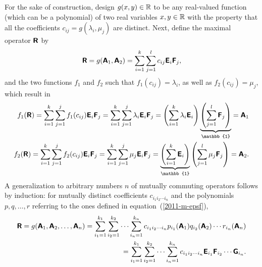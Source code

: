 {For the sake of construction, design $g(x,y)\in {\Bbb R}$ to be any real-valued function (which can be a polynomial) of two real variables $x,y \in {\Bbb R}$ with the property
that all the coefficients  $c_{ij} = g( \lambda_i,\mu_j )$ are distinct.
Next, define  the maximal operator $\textsf{\textbf{R}}$ by
\begin{equation}
\textsf{\textbf{R}} = g(\textsf{\textbf{A}}_1, \textsf{\textbf{A}}_2) =  \sum_{i=1}^k \sum_{j=1}^l c_{ij}  \textsf{\textbf{E}}_i\textsf{\textbf{F}}_j,
\end{equation}
and the two functions $f_1$ and $f_2$ such that
$f_1(c_{ij}) = \lambda_i$, as well as
$f_2(c_{ij}) = \mu_j$, which result in
\begin{equation}
\begin{split}
f_1(\textsf{\textbf{R}}) = \sum_{i=1}^k \sum_{j=1}^j f_1(c_{ij})  \textsf{\textbf{E}}_i\textsf{\textbf{F}}_j = \sum_{i=1}^k \sum_{j=1}^j \lambda_i  \textsf{\textbf{E}}_i\textsf{\textbf{F}}_j
= \left( \sum_{i=1}^k \lambda_i \textsf{\textbf{E}}_i\right) \underbrace{\left(\sum_{j=1}^l \textsf{\textbf{F}}_j\right)}_\mathbb{1} = \textsf{\textbf{A}}_1
\\
f_2(\textsf{\textbf{R}}) = \sum_{i=1}^k \sum_{j=1}^j f_2(c_{ij})  \textsf{\textbf{E}}_i\textsf{\textbf{F}}_j = \sum_{i=1}^k \sum_{j=1}^j \mu_j  \textsf{\textbf{E}}_i\textsf{\textbf{F}}_j
= \underbrace{\left(\sum_{i=1}^k \textsf{\textbf{E}}_i\right)}_\mathbb{1}\left( \sum_{j=1}^l \mu_j \textsf{\textbf{F}}_j\right)  = \textsf{\textbf{A}}_2
.
\end{split}
\end{equation}
A generalization to arbitrary numbers $n$ of mutually commuting operators follows by induction:
for mutually distinct coefficients $c_{i_1 i_2 \cdots i_n}$ and the polynomials $p,q,\ldots ,r$ referring
to the ones defined in equation~(\ref{2011-m-epsf}),
\begin{equation}
\begin{split}
\textsf{\textbf{R}} = g(\textsf{\textbf{A}}_1, \textsf{\textbf{A}}_2,\dots , \textsf{\textbf{A}}_n)
=  \sum_{i_1=1}^{k_1} \sum_{i_2=1}^{k_2} \cdots  \sum_{i_n=1}^{k_n}
c_{i_1 i_2 \cdots i_n}  p_{i_1}(\textsf{\textbf{A}}_1) q_{i_2}(\textsf{\textbf{A}}_2) \cdots r_{i_n}(\textsf{\textbf{A}}_n)
\\
=  \sum_{i_1=1}^{k_1} \sum_{i_2=1}^{k_2} \cdots  \sum_{i_n=1}^{k_n}
c_{i_1 i_2 \cdots i_n}  \textsf{\textbf{E}}_{i_1}\textsf{\textbf{F}}_{i_2} \cdots \textsf{\textbf{G}}_{i_n}
.
\end{split}
\end{equation}
\eproof
}

